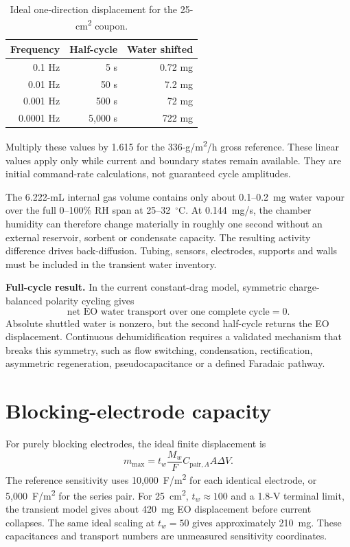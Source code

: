 \documentclass[10pt,a4paper]{article}
\begin{document}
\begin{table}[htbp]
\centering
\caption{Ideal one-direction displacement for the 25-cm\textsuperscript{2} coupon.}
\begin{tabular}{@{}rrr@{}}
\toprule
Frequency & Half-cycle & Water shifted \\
\midrule
0.1 Hz & 5 s & 0.72 mg \\
0.01 Hz & 50 s & 7.2 mg \\
0.001 Hz & 500 s & 72 mg \\
0.0001 Hz & 5,000 s & 722 mg \\
\bottomrule
\end{tabular}
\end{table}

Multiply these values by 1.615 for the 336-g/m\textsuperscript{2}/h gross
reference. These linear values apply only while current and boundary states
remain available. They are initial command-rate calculations, not guaranteed
cycle amplitudes.

The 6.222-mL internal gas volume contains only about 0.1--0.2~mg water vapour
over the full 0--100\% RH span at 25--32~$^\circ$C. At 0.144~mg/s, the chamber
humidity can therefore change materially in roughly one second without an
external reservoir, sorbent or condensate capacity. The resulting activity
difference drives back-diffusion. Tubing, sensors, electrodes, supports and
walls must be included in the transient water inventory.

\begin{stopbox}
\textbf{Full-cycle result.} In the current constant-drag model, symmetric
charge-balanced polarity cycling gives
\[
\boxed{\text{net EO water transport over one complete cycle}=0.}
\]
Absolute shuttled water is nonzero, but the second half-cycle returns the EO
displacement. Continuous dehumidification requires a validated mechanism that
breaks this symmetry, such as flow switching, condensation, rectification,
asymmetric regeneration, pseudocapacitance or a defined Faradaic pathway.
\end{stopbox}

\section{Blocking-electrode capacity}

For purely blocking electrodes, the ideal finite displacement is
\[
m_{\max}=t_w\frac{M_w}{F}C_{\mathrm{pair},A}A\Delta V.
\]
The reference sensitivity uses 10,000~F/m\textsuperscript{2} for each identical
electrode, or 5,000~F/m\textsuperscript{2} for the series pair. For 25~cm\textsuperscript{2},
$t_w\approx100$ and a 1.8-V terminal limit, the transient model gives about
420~mg EO displacement before current collapses. The same ideal scaling at
$t_w=50$ gives approximately 210~mg. These capacitances and transport numbers
are unmeasured sensitivity coordinates.
\end{document}
